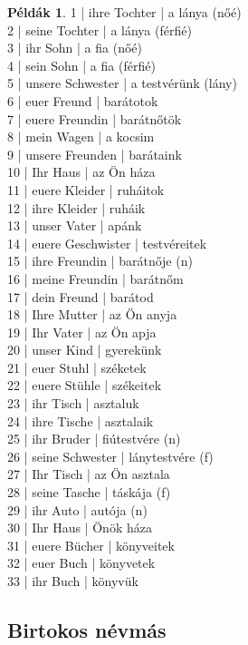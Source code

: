 \documentclass{article}
\theoremstyle{definition}
\newtheorem*{exmp}{Példák}
\begin{document}
\begin{exmp}
1 | ihre Tochter | a lánya (nőé)\\
2 | seine Tochter | a lánya (férfié)\\
3 | ihr Sohn | a fia (nőé)\\
4 | sein Sohn | a fia (férfié)\\
5 | unsere Schwester | a testvérünk (lány)\\
6 | euer Freund | barátotok\\
7 | euere Freundin | barátnőtök\\
8 | mein Wagen | a kocsim\\
9 | unsere Freunden | barátaink\\
10 | Ihr Haus | az Ön háza\\
11 | euere Kleider | ruháitok\\
12 | ihre Kleider | ruháik\\
13 | unser Vater | apánk\\
14 | euere Geschwister | testvéreitek\\
15 | ihre Freundin | barátnője (n)\\
16 | meine Freundin | barátnőm\\
17 | dein Freund | barátod\\
18 | Ihre Mutter | az Ön anyja\\
19 | Ihr Vater | az Ön apja\\
20 | unser Kind | gyerekünk\\
21 | euer Stuhl | széketek\\
22 | euere Stühle | székeitek\\
23 | ihr Tisch | asztaluk\\
24 | ihre Tische | asztalaik\\
25 | ihr Bruder | fiútestvére (n)\\
26 | seine Schwester | lánytestvére (f)\\
27 | Ihr Tisch | az Ön asztala\\
28 | seine Tasche | táskája (f)\\
29 | ihr Auto | autója (n)\\
30 | Ihr Haus | Önök háza\\
31 | euere Bücher | könyveitek\\
32 | euer Buch | könyvetek\\
33 | ihr Buch | könyvük\\
\end{exmp}

\subsection{Birtokos névmás}
\end{document}
